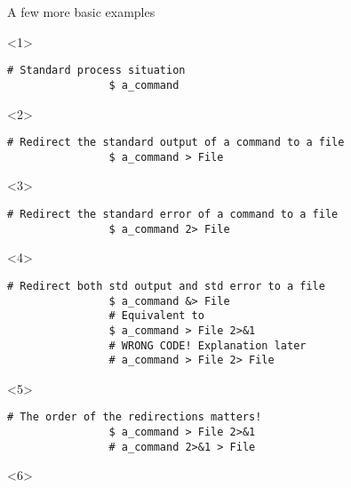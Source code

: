 \begin{frame}[fragile]{A few more basic examples}
    \vspace{2mm}
    \begin{overlayarea}{\textwidth}{0.25\textheight}
        \begin{onlyenv}<1>
            \begin{lstlisting}[style=MyBash, numbers=none]
                # Standard process situation
                $ a_command
            \end{lstlisting}
        \end{onlyenv}
        \begin{onlyenv}<2>
            \begin{lstlisting}[style=MyBash, numbers=none]
                # Redirect the standard output of a command to a file
                $ a_command > File
            \end{lstlisting}
        \end{onlyenv}
        \begin{onlyenv}<3>
            \begin{lstlisting}[style=MyBash, numbers=none]
                # Redirect the standard error of a command to a file
                $ a_command 2> File
            \end{lstlisting}
        \end{onlyenv}
        \begin{onlyenv}<4>
            \begin{lstlisting}[style=MyBash, numbers=none]
                # Redirect both std output and std error to a file
                $ a_command &> File
                # Equivalent to
                $ a_command > File 2>&1
                # WRONG CODE! Explanation later
                # a_command > File 2> File
            \end{lstlisting}
        \end{onlyenv}
        \begin{onlyenv}<5>
            \begin{lstlisting}[style=MyBash, numbers=none]
                # The order of the redirections matters!
                $ a_command > File 2>&1
                # a_command 2>&1 > File
            \end{lstlisting}
        \end{onlyenv}
        \begin{onlyenv}<6>
            \begin{lstlisting}[style=MyBash, numbers=none]

\end{lstlisting}
\end{onlyenv}
\end{overlayarea}
\end{frame}
